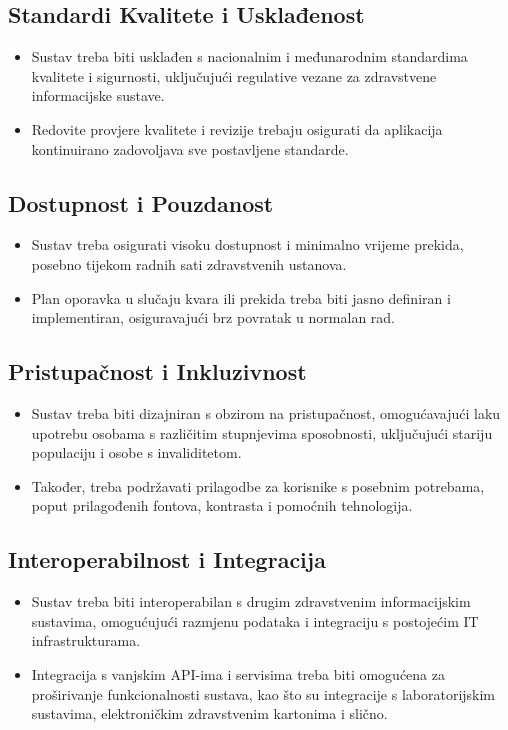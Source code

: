 \subsection*{Standardi Kvalitete i Usklađenost}
\begin{itemize}
\item Sustav treba biti usklađen s nacionalnim i međunarodnim standardima kvalitete i sigurnosti, uključujući regulative vezane za zdravstvene informacijske sustave.
\item Redovite provjere kvalitete i revizije trebaju osigurati da aplikacija kontinuirano zadovoljava sve postavljene standarde.
\end{itemize}

\subsection*{Dostupnost i Pouzdanost}
\begin{itemize}
\item Sustav treba osigurati visoku dostupnost i minimalno vrijeme prekida, posebno tijekom radnih sati zdravstvenih ustanova.
\item Plan oporavka u slučaju kvara ili prekida treba biti jasno definiran i implementiran, osiguravajući brz povratak u normalan rad.
\end{itemize}

\subsection*{Pristupačnost i Inkluzivnost}
\begin{itemize}
\item Sustav treba biti dizajniran s obzirom na pristupačnost, omogućavajući laku upotrebu osobama s različitim stupnjevima sposobnosti, uključujući stariju populaciju i osobe s invaliditetom.
\item Također, treba podržavati prilagodbe za korisnike s posebnim potrebama, poput prilagođenih fontova, kontrasta i pomoćnih tehnologija.
\end{itemize}

\subsection*{Interoperabilnost i Integracija}
\begin{itemize}
    \item Sustav treba biti interoperabilan s drugim zdravstvenim informacijskim sustavima, omogućujući razmjenu podataka i integraciju s postojećim IT infrastrukturama.
    \item Integracija s vanjskim API-ima i servisima treba biti omogućena za proširivanje funkcionalnosti sustava, kao što su integracije s laboratorijskim sustavima, elektroničkim zdravstvenim kartonima i slično.
\end{itemize}

